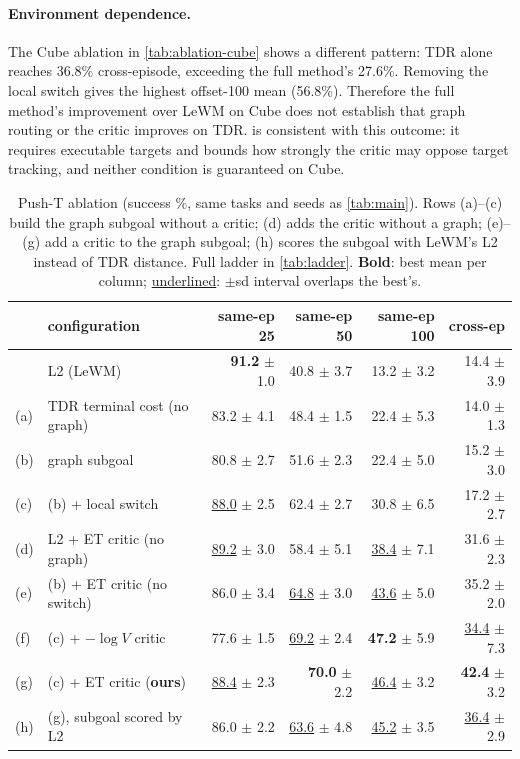 \documentclass{article} %
\theoremstyle{definition}
\theoremstyle{remark}
\begin{document}
\paragraph{Environment dependence.}
The Cube ablation in \cref{tab:ablation-cube} shows a different pattern:
TDR alone reaches 36.8\% cross-episode, exceeding the full method's 27.6\%.
Removing the local switch gives the highest offset-100 mean (56.8\%).
Therefore the full method's improvement over LeWM on Cube does not establish that
graph routing or the critic improves on TDR.  is consistent with this
outcome: it requires executable targets and bounds how strongly the critic may oppose target
tracking, and neither condition is guaranteed on Cube.


\begin{table}[t]
\centering\small
\caption{Push-T ablation (success \%, same tasks and seeds as \cref{tab:main}). Rows (a)--(c)
build the graph subgoal without a critic; (d) adds the critic without a graph; (e)--(g) add a
critic to the graph subgoal; (h) scores the subgoal with LeWM's L2 instead of TDR distance.
Full ladder in \cref{tab:ladder}. \textbf{Bold}: best mean per column; \underline{underlined}:
$\pm$sd interval overlaps the best's.}
\label{tab:ablation}
\begin{tabular}{llrrrr}
\toprule
& configuration & same-ep 25 & same-ep 50 & same-ep 100 & cross-ep \\
\midrule
& L2 (LeWM) & \textbf{91.2} $\pm$ 1.0 & 40.8 $\pm$ 3.7 & 13.2 $\pm$ 3.2 & 14.4 $\pm$ 3.9 \\
(a) & TDR terminal cost (no graph) & 83.2 $\pm$ 4.1 & 48.4 $\pm$ 1.5 & 22.4 $\pm$ 5.3 & 14.0 $\pm$ 1.3 \\
(b) & graph subgoal & 80.8 $\pm$ 2.7 & 51.6 $\pm$ 2.3 & 22.4 $\pm$ 5.0 & 15.2 $\pm$ 3.0 \\
(c) & (b) + local switch & \underline{88.0} $\pm$ 2.5 & 62.4 $\pm$ 2.7 & 30.8 $\pm$ 6.5 & 17.2 $\pm$ 2.7 \\
\midrule
(d) & L2 + ET critic (no graph) & \underline{89.2} $\pm$ 3.0 & 58.4 $\pm$ 5.1 & \underline{38.4} $\pm$ 7.1 & 31.6 $\pm$ 2.3 \\
(e) & (b) + ET critic (no switch) & 86.0 $\pm$ 3.4 & \underline{64.8} $\pm$ 3.0 & \underline{43.6} $\pm$ 5.0 & 35.2 $\pm$ 2.0 \\
(f) & (c) + $-\log V$ critic & 77.6 $\pm$ 1.5 & \underline{69.2} $\pm$ 2.4 & \textbf{47.2} $\pm$ 5.9 & \underline{34.4} $\pm$ 7.3 \\
(g) & (c) + ET critic (\textbf{ours}) & \underline{88.4} $\pm$ 2.3 & \textbf{70.0} $\pm$ 2.2 & \underline{46.4} $\pm$ 3.2 & \textbf{42.4} $\pm$ 3.2 \\
(h) & (g), subgoal scored by L2 & 86.0 $\pm$ 2.2 & \underline{63.6} $\pm$ 4.8 & \underline{45.2} $\pm$ 3.5 & \underline{36.4} $\pm$ 2.9 \\
\bottomrule
\end{tabular}
\end{table}
\end{document}
